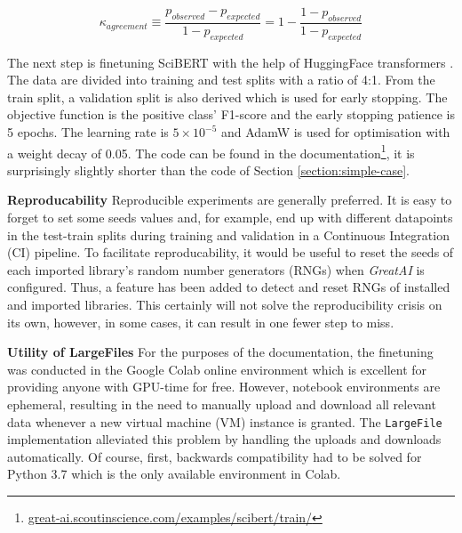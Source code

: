 \begin{equation} \label{equation:kappa}
\kappa_{agreement} \equiv \frac{p_{observed} - p_{expected}}{1 - p_{expected}} = 1 - \frac{1 - p_{observed}}{1 - p_{expected}} 
\end{equation}

The next step is finetuning SciBERT with the help of HuggingFace transformers \cite{wolf2019huggingface}. The data are divided into training and test splits with a ratio of 4:1. From the train split, a validation split is also derived which is used for early stopping. The objective function is the positive class' F1-score and the early stopping patience is 5 epochs. The learning rate is $5 \times 10^{-5}$ and AdamW \cite{loshchilov2017decoupled} is used for optimisation with a weight decay of 0.05. The code can be found in the documentation\footnote{\href{https://great-ai.scoutinscience.com/examples/scibert/train/}{great-ai.scoutinscience.com/examples/scibert/train/}}, it is surprisingly slightly shorter than the code of Section \ref{section:simple-case}.

\begin{displayquote}
\textbf{Reproducability} Reproducible experiments are generally preferred. It is easy to forget to set some seeds values and, for example, end up with different datapoints in the test-train splits during training and validation in a Continuous Integration (CI) pipeline. To facilitate reproducability, it would be useful to reset the seeds of each imported library's random number generators (RNGs) when \textit{GreatAI} is configured. Thus, a feature has been added to detect and reset RNGs of installed and imported libraries. This certainly will not solve the reproducibility crisis \cite{hutson2018artificial} on its own, however, in some cases, it can result in one fewer step to miss.
\end{displayquote}

\begin{displayquote}
\textbf{Utility of LargeFiles} For the purposes of the documentation, the finetuning was conducted in the Google Colab online environment which is excellent for providing anyone with GPU-time for free. However, notebook environments are ephemeral, resulting in the need to manually upload and download all relevant data whenever a new virtual machine (VM) instance is granted. The \texttt{LargeFile} implementation alleviated this problem by handling the uploads and downloads automatically. Of course, first, backwards compatibility had to be solved for Python 3.7 which is the only available environment in Colab.
\end{displayquote}

